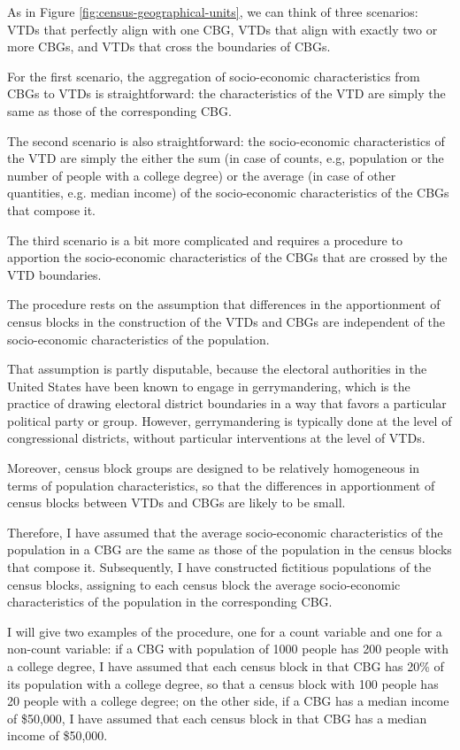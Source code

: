 As in Figure \ref{fig:census-geographical-units}, we can think of three scenarios: VTDs that perfectly align with one CBG, VTDs that align with exactly two or more CBGs, and VTDs that cross the boundaries of CBGs.

For the first scenario, the aggregation of socio-economic characteristics from CBGs to VTDs is straightforward: the characteristics of the VTD are simply the same as those of the corresponding CBG.

The second scenario is also straightforward: the socio-economic characteristics of the VTD are simply the either the sum (in case of counts, e.g, population or the number of people with a college degree) or the average (in case of other quantities, e.g. median income) of the socio-economic characteristics of the CBGs that compose it.

The third scenario is a bit more complicated and requires a procedure to apportion the socio-economic characteristics of the CBGs that are crossed by the VTD boundaries.

The procedure rests on the assumption that differences in the apportionment of census blocks in the construction of the VTDs and CBGs are independent of the socio-economic characteristics of the population.

That assumption is partly disputable, because the electoral authorities in the United States have been known to engage in gerrymandering, which is the practice of drawing electoral district boundaries in a way that favors a particular political party or group.
However, gerrymandering is typically done at the level of congressional districts, without particular interventions at the level of VTDs.

Moreover, census block groups are designed to be relatively homogeneous in terms of population characteristics, so that the differences in apportionment of census blocks between VTDs and CBGs are likely to be small.

Therefore, I have assumed that the average socio-economic characteristics of the population in a CBG are the same as those of the population in the census blocks that compose it.
Subsequently, I have constructed fictitious populations of the census blocks, assigning to each census block the average socio-economic characteristics of the population in the corresponding CBG.

I will give two examples of the procedure, one for a count variable and one for a non-count variable: if a CBG with population of 1000 people has 200 people with a college degree, I have assumed that each census block in that CBG has 20\% of its population with a college degree, so that a census block with 100 people has 20 people with a college degree; on the other side, if a CBG has a median income of \$50,000, I have assumed that each census block in that CBG has a median income of \$50,000.

